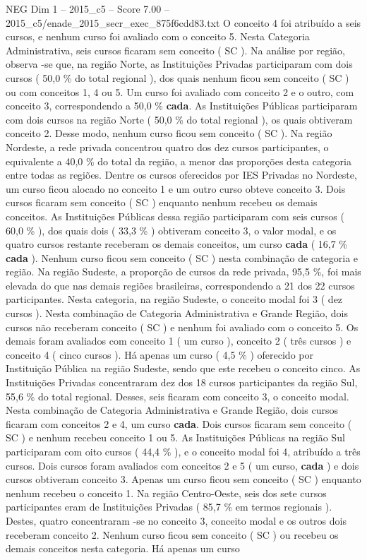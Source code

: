 \begin{textsample}{NEG Dim 1 – 2015\_c5 – Score 7.00 – 2015\_c5/enade\_2015\_secr\_exec\_875f6cdd83.txt}
O conceito 4 foi atribuído a seis cursos, e nenhum curso foi avaliado com o conceito 5.
Nesta Categoria Administrativa, seis cursos ficaram sem conceito ( SC ).
Na análise por região, observa -se que, na região Norte, as Instituições Privadas participaram com dois cursos ( 50,0 \% do total regional ), dos quais nenhum ficou sem conceito ( SC ) ou com conceitos 1, 4 ou 5.
Um curso foi avaliado com conceito 2 e o outro, com conceito 3, correspondendo a 50,0 \% \textbf{cada}.
As Instituições Públicas participaram com dois cursos na região Norte ( 50,0 \% do total regional ), os quais obtiveram conceito 2.
Desse modo, nenhum curso ficou sem conceito ( SC ).
Na região Nordeste, a rede privada concentrou quatro dos dez cursos participantes, o equivalente a 40,0 \% do total da região, a menor das proporções desta categoria entre todas as regiões.
Dentre os cursos oferecidos por IES Privadas no Nordeste, um curso ficou alocado no conceito 1 e um outro curso obteve conceito 3.
Dois cursos ficaram sem conceito ( SC ) enquanto nenhum recebeu os demais conceitos.
As Instituições Públicas dessa região participaram com seis cursos ( 60,0 \% ), dos quais dois ( 33,3 \% ) obtiveram conceito 3, o valor modal, e os quatro cursos restante receberam os demais conceitos, um curso \textbf{cada} ( 16,7 \% \textbf{cada} ).
Nenhum curso ficou sem conceito ( SC ) nesta combinação de categoria e região.
Na região Sudeste, a proporção de cursos da rede privada, 95,5 \%, foi mais elevada do que nas demais regiões brasileiras, correspondendo a 21 dos 22 cursos participantes.
Nesta categoria, na região Sudeste, o conceito modal foi 3 ( dez cursos ).
Nesta combinação de Categoria Administrativa e Grande Região, dois cursos não receberam conceito ( SC ) e nenhum foi avaliado com o conceito 5.
Os demais foram avaliados com conceito 1 ( um curso ), conceito 2 ( três cursos ) e conceito 4 ( cinco cursos ).
Há apenas um curso ( 4,5 \% ) oferecido por Instituição Pública na região Sudeste, sendo que este recebeu o conceito cinco.
As Instituições Privadas concentraram dez dos 18 cursos participantes da região Sul, 55,6 \% do total regional.
Desses, seis ficaram com conceito 3, o conceito modal.
Nesta combinação de Categoria Administrativa e Grande Região, dois cursos ficaram com conceitos 2 e 4, um curso \textbf{cada}.
Dois cursos ficaram sem conceito ( SC ) e nenhum recebeu conceito 1 ou 5.
As Instituições Públicas na região Sul participaram com oito cursos ( 44,4 \% ), e o conceito modal foi 4, atribuído a três cursos.
Dois cursos foram avaliados com conceitos 2 e 5 ( um curso, \textbf{cada} ) e dois cursos obtiveram conceito 3.
Apenas um curso ficou sem conceito ( SC ) enquanto nenhum recebeu o conceito 1.
Na região Centro-Oeste, seis dos sete cursos participantes eram de Instituições Privadas ( 85,7 \% em termos regionais ).
Destes, quatro concentraram -se no conceito 3, conceito modal e os outros dois receberam conceito 2.
Nenhum curso ficou sem conceito ( SC ) ou recebeu os demais conceitos nesta categoria.
Há apenas um curso

\end{textsample}
